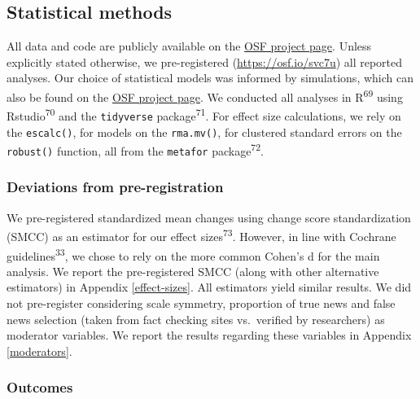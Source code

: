 \documentclass[
  man]{apa6}
\begin{document}
\subsection{Statistical methods}\label{statistical-methods}

All data and code are publicly available on the \href{https://osf.io/96zbp/?view_only=d2f3147f652e44e2a0414d7d6d9a6c29}{OSF project page}. Unless explicitly stated otherwise, we pre-registered (\url{https://osf.io/svc7u}) all reported analyses. Our choice of statistical models was informed by simulations, which can also be found on the \href{https://osf.io/96zbp/?view_only=d2f3147f652e44e2a0414d7d6d9a6c29}{OSF project page}. We conducted all analyses in R\textsuperscript{69} using Rstudio\textsuperscript{70} and the \texttt{tidyverse} package\textsuperscript{71}. For effect size calculations, we rely on the \texttt{escalc()}, for models on the \texttt{rma.mv()}, for clustered standard errors on the \texttt{robust()} function, all from the \texttt{metafor} package\textsuperscript{72}.

\subsubsection{Deviations from pre-registration}\label{deviations-from-pre-registration}

We pre-registered standardized mean changes using change score standardization (SMCC) as an estimator for our effect sizes\textsuperscript{73}. However, in line with Cochrane guidelines\textsuperscript{33}, we chose to rely on the more common Cohen's d for the main analysis. We report the pre-registered SMCC (along with other alternative estimators) in Appendix \ref{effect-sizes}. All estimators yield similar results. We did not pre-register considering scale symmetry, proportion of true news and false news selection (taken from fact checking sites vs.~verified by researchers) as moderator variables. We report the results regarding these variables in Appendix \ref{moderators}.

\subsubsection{Outcomes}\label{outcomes}
\end{document}
